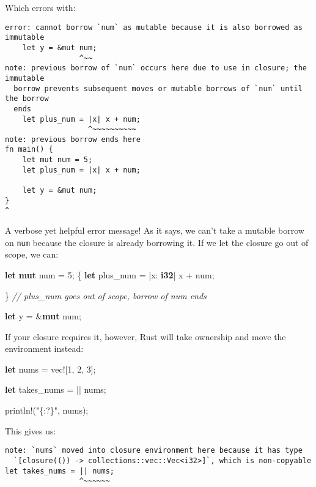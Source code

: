 \documentclass[a4paper,]{book}
\newenvironment{Shaded}{\begin{snugshade}}{\end{snugshade}}
\newcommand{\KeywordTok}[1]{\textcolor[rgb]{0.13,0.29,0.53}{\textbf{{#1}}}}
\newcommand{\DecValTok}[1]{\textcolor[rgb]{0.00,0.00,0.81}{{#1}}}
\newcommand{\StringTok}[1]{\textcolor[rgb]{0.31,0.60,0.02}{{#1}}}
\newcommand{\CommentTok}[1]{\textcolor[rgb]{0.56,0.35,0.01}{\textit{{#1}}}}
\newcommand{\OtherTok}[1]{\textcolor[rgb]{0.56,0.35,0.01}{{#1}}}
\newcommand{\NormalTok}[1]{{#1}}
\begin{document}
Which errors with:

\begin{verbatim}
error: cannot borrow `num` as mutable because it is also borrowed as immutable
    let y = &mut num;
                 ^~~
note: previous borrow of `num` occurs here due to use in closure; the immutable
  borrow prevents subsequent moves or mutable borrows of `num` until the borrow
  ends
    let plus_num = |x| x + num;
                   ^~~~~~~~~~~
note: previous borrow ends here
fn main() {
    let mut num = 5;
    let plus_num = |x| x + num;
    
    let y = &mut num;
}
^
\end{verbatim}

A verbose yet helpful error message! As it says, we can't take a mutable
borrow on \texttt{num} because the closure is already borrowing it. If
we let the closure go out of scope, we can:

\begin{Shaded}
\begin{Highlighting}[]
\KeywordTok{let} \KeywordTok{mut} \NormalTok{num = }\DecValTok{5}\NormalTok{;}
\NormalTok{\{}
    \KeywordTok{let} \NormalTok{plus_num = |x: }\KeywordTok{i32}\NormalTok{| x + num;}

\NormalTok{\} }\CommentTok{// plus_num goes out of scope, borrow of num ends}

\KeywordTok{let} \NormalTok{y = &}\KeywordTok{mut} \NormalTok{num;}
\end{Highlighting}
\end{Shaded}

If your closure requires it, however, Rust will take ownership and move
the environment instead:

\begin{Shaded}
\begin{Highlighting}[]
\KeywordTok{let} \NormalTok{nums = }\OtherTok{vec!}\NormalTok{[}\DecValTok{1}\NormalTok{, }\DecValTok{2}\NormalTok{, }\DecValTok{3}\NormalTok{];}

\KeywordTok{let} \NormalTok{takes_nums = || nums;}

\OtherTok{println!}\NormalTok{(}\StringTok{"\{:?\}"}\NormalTok{, nums);}
\end{Highlighting}
\end{Shaded}

This gives us:

\begin{verbatim}
note: `nums` moved into closure environment here because it has type
  `[closure(()) -> collections::vec::Vec<i32>]`, which is non-copyable
let takes_nums = || nums;
                 ^~~~~~~
\end{verbatim}
\end{document}
